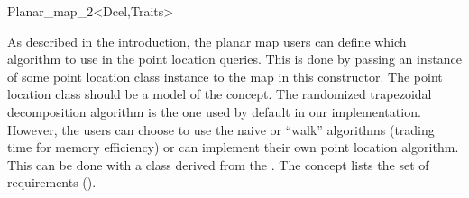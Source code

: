 \begin{ccRefClass}{Planar_map_2<Dcel,Traits>}
    
        



\begin{ccAdvanced}


As described in the introduction, the planar map users can define
which algorithm to use in the point location queries.  This is done
by passing an instance of some point location class instance to the map in
this constructor. The point location class should be a model of the
 concept. The randomized trapezoidal
decomposition algorithm is the one used by default in our
implementation.  However, the users can choose to use the naive or
``walk'' algorithms (trading time for memory efficiency) or can
implement their own point location algorithm. This can be done with a
class derived from the . The concept  lists the set of requirements 
().

  



\end{ccAdvanced}
\end{ccRefClass}
